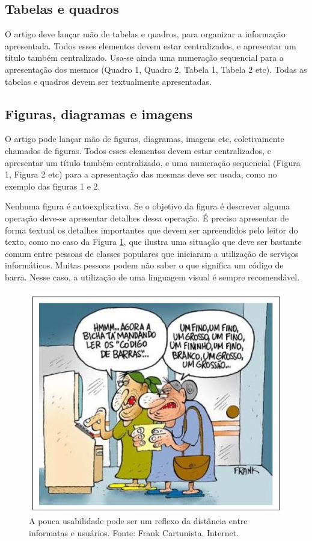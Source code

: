 \documentclass[12pt]{article}
\begin{document}
	\subsection{Tabelas e quadros}

	O artigo deve lançar mão de tabelas e quadros, para organizar a informação apresentada. Todos esses elementos devem estar centralizados, e apresentar um título também centralizado. Usa-se ainda uma numeração sequencial para a apresentação dos mesmos (Quadro 1, Quadro 2, Tabela 1, Tabela 2 etc). Todas as tabelas e quadros devem ser textualmente apresentadas.

	\subsection{Figuras, diagramas e imagens}

	O artigo pode lançar mão de figuras, diagramas, imagens etc, coletivamente chamados de figuras. Todos esses elementos devem estar centralizados, e apresentar um título também centralizado, e uma numeração sequencial (Figura 1, Figura 2 etc) para a apresentação das mesmas deve ser usada, como no exemplo das figuras 1 e 2.

	Nenhuma figura é autoexplicativa. Se o objetivo da figura é descrever alguma operação deve-se apresentar detalhes dessa operação.
	É preciso apresentar de forma textual os detalhes importantes que devem ser apreendidos pelo leitor do texto, como no caso da Figura \ref{fig:1}, que ilustra uma situação que deve ser bastante comum entre pessoas de classes populares que iniciaram a utilização de serviços informáticos. Muitas pessoas podem não saber o que significa um código de barra. Nesse caso, a utilização de uma linguagem visual é sempre recomendável.

	\begin{figure}[ht]
		\centering
		\includegraphics[width=.7\textwidth]{piada-codigodebarras.JPG}
		\caption{A pouca usabilidade pode ser um reflexo da distância entre informatas e usuários. Fonte: Frank Cartunista. Internet. }\label{fig:1}
	\end{figure}
\end{document}
